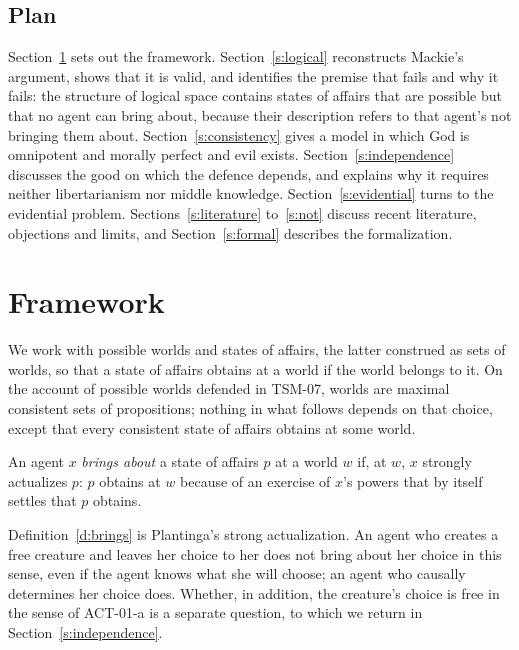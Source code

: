 \documentclass{situationist-preprint}
\begin{document}
\subsection{Plan}

Section~\ref{s:framework} sets out the framework. Section~\ref{s:logical} reconstructs Mackie's argument, shows that it is valid, and identifies the premise that fails and why it fails: the structure of logical space contains states of affairs that are possible but that no agent can bring about, because their description refers to that agent's not bringing them about. Section~\ref{s:consistency} gives a model in which God is omnipotent and morally perfect and evil exists. Section~\ref{s:independence} discusses the good on which the defence depends, and explains why it requires neither libertarianism nor middle knowledge. Section~\ref{s:evidential} turns to the evidential problem. Sections~\ref{s:literature} to~\ref{s:not} discuss recent literature, objections and limits, and Section~\ref{s:formal} describes the formalization.

\section{Framework}\label{s:framework}

We work with possible worlds and states of affairs, the latter construed as sets of worlds, so that a state of affairs obtains at a world if the world belongs to it. On the account of possible worlds defended in TSM-07, worlds are maximal consistent sets of propositions; nothing in what follows depends on that choice, except that every consistent state of affairs obtains at some world.

\begin{definition}\label{d:brings}
An agent $x$ \emph{brings about} a state of affairs $p$ at a world $w$ if, at $w$, $x$ strongly actualizes $p$: $p$ obtains at $w$ because of an exercise of $x$'s powers that by itself settles that $p$ obtains.
\end{definition}

Definition~\ref{d:brings} is Plantinga's strong actualization. An agent who creates a free creature and leaves her choice to her does not bring about her choice in this sense, even if the agent knows what she will choose; an agent who causally determines her choice does. Whether, in addition, the creature's choice is free in the sense of ACT-01-a is a separate question, to which we return in Section~\ref{s:independence}.
\end{document}
